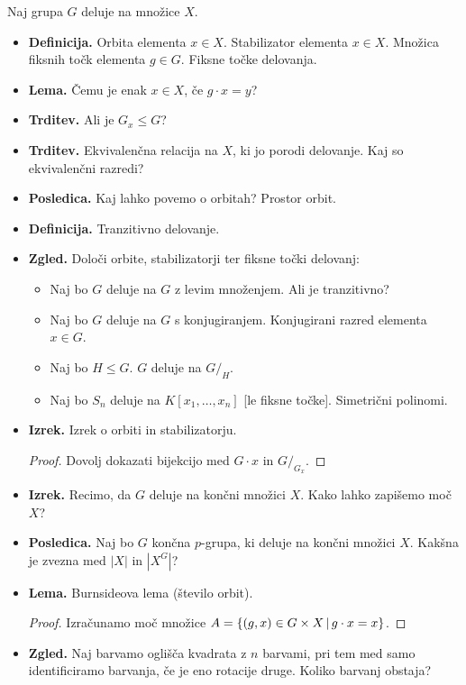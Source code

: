 \begin{enumerate}
    Naj grupa \(G\) deluje na množice \(X\).
    \begin{itemize}
        \item \textbf{Definicija.} Orbita elementa \(x \in X\). Stabilizator elementa \(x \in X\). Množica fiksnih točk elementa \(g \in G\). Fiksne točke delovanja.
        \item \textbf{Lema.} Čemu je enak \(x \in X\), če \(g \cdot x = y\)?
        \item \textbf{Trditev.} Ali je \(G_x \leq G\)?
        \item \textbf{Trditev.} Ekvivalenčna relacija na \(X\), ki jo porodi delovanje. Kaj so ekvivalenčni razredi?
        \item \textbf{Posledica.} Kaj lahko povemo o orbitah? Prostor orbit.
        \item \textbf{Definicija.} Tranzitivno delovanje.
        \item \textbf{Zgled.} Določi orbite, stabilizatorji ter fiksne točki delovanj:
        \begin{itemize}
            \item Naj bo \(G\) deluje na \(G\) z levim množenjem. Ali je tranzitivno?
            \item Naj bo \(G\) deluje na \(G\) s konjugiranjem. Konjugirani razred elementa \(x \in G\).
            \item Naj bo \(H \leq G\). \(G\) deluje na \(G/_H\).
            \item Naj bo \(S_n\) deluje na \(K[x_1, \ldots, x_n]\) [le fiksne točke]. Simetrični polinomi.
        \end{itemize}
        \item \textbf{Izrek.} Izrek o orbiti in stabilizatorju. \todo{*}
        \begin{proof}
            Dovolj dokazati bijekcijo med \(G \cdot x\) in \(G/_{G_x}\).
        \end{proof}
        \item \textbf{Izrek.} Recimo, da \(G\) deluje na končni množici \(X\). Kako lahko zapišemo moč \(X\)?
        \item \textbf{Posledica.} Naj bo \(G\) končna \(p\)-grupa, ki deluje na končni množici \(X\). Kakšna je zvezna med \(|X|\) in \(|X^G|\)?
        \newpage
        \item \textbf{Lema.} Burnsideova lema (število orbit).
        \begin{proof}
            Izračunamo moč množice \(A = \{(g, x) \in G \times X \,|\, g \cdot x = x\}\).
        \end{proof}
        \item \textbf{Zgled.} Naj barvamo oglišča kvadrata z \(n\) barvami, pri tem med samo identificiramo barvanja, če je eno rotacije druge. Koliko barvanj obstaja?
    \end{itemize}


\end{enumerate}
